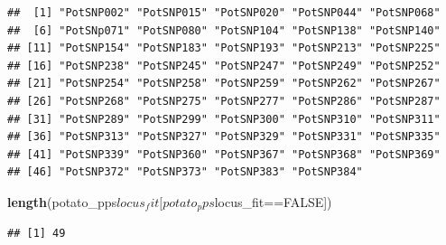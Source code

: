 \documentclass[]{article}
\newenvironment{Shaded}{\begin{snugshade}}{\end{snugshade}}
\newcommand{\KeywordTok}[1]{\textcolor[rgb]{0.13,0.29,0.53}{\textbf{{#1}}}}
\newcommand{\DataTypeTok}[1]{\textcolor[rgb]{0.13,0.29,0.53}{{#1}}}
\newcommand{\DecValTok}[1]{\textcolor[rgb]{0.00,0.00,0.81}{{#1}}}
\newcommand{\FloatTok}[1]{\textcolor[rgb]{0.00,0.00,0.81}{{#1}}}
\newcommand{\StringTok}[1]{\textcolor[rgb]{0.31,0.60,0.02}{{#1}}}
\newcommand{\CommentTok}[1]{\textcolor[rgb]{0.56,0.35,0.01}{\textit{{#1}}}}
\newcommand{\OtherTok}[1]{\textcolor[rgb]{0.56,0.35,0.01}{{#1}}}
\newcommand{\NormalTok}[1]{{#1}}
\begin{document}
\begin{verbatim}
##  [1] "PotSNP002" "PotSNP015" "PotSNP020" "PotSNP044" "PotSNP068"
##  [6] "PotSNp071" "PotSNP080" "PotSNP104" "PotSNP138" "PotSNP140"
## [11] "PotSNP154" "PotSNP183" "PotSNP193" "PotSNP213" "PotSNP225"
## [16] "PotSNP238" "PotSNP245" "PotSNP247" "PotSNP249" "PotSNP252"
## [21] "PotSNP254" "PotSNP258" "PotSNP259" "PotSNP262" "PotSNP267"
## [26] "PotSNP268" "PotSNP275" "PotSNP277" "PotSNP286" "PotSNP287"
## [31] "PotSNP289" "PotSNP299" "PotSNP300" "PotSNP310" "PotSNP311"
## [36] "PotSNP313" "PotSNP327" "PotSNP329" "PotSNP331" "PotSNP335"
## [41] "PotSNP339" "PotSNP360" "PotSNP367" "PotSNP368" "PotSNP369"
## [46] "PotSNP372" "PotSNP373" "PotSNP383" "PotSNP384"
\end{verbatim}

\begin{Shaded}
\begin{Highlighting}[]
\KeywordTok{length}\NormalTok{(potato_pps$locus_fit[potato_pps$locus_fit==}\OtherTok{FALSE}\NormalTok{])}
\end{Highlighting}
\end{Shaded}

\begin{verbatim}
## [1] 49
\end{verbatim}

\begin{Shaded}
\end{Shaded}
\end{document}
